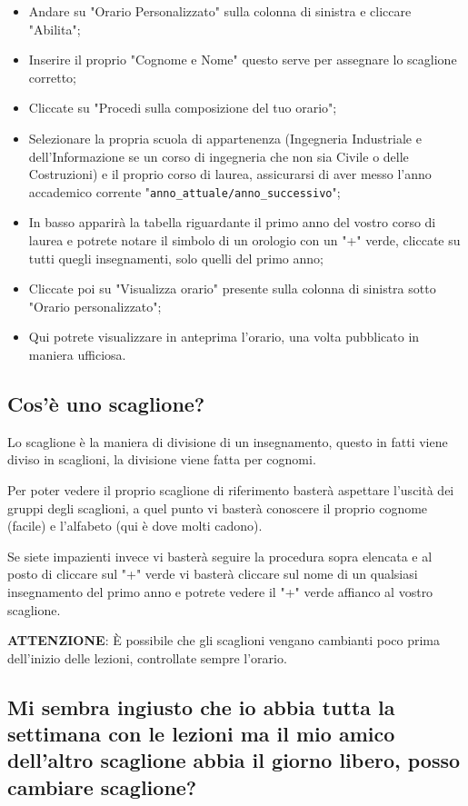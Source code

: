 \documentclass[legal]{polinetwork}
\begin{document}
\begin{itemize}
  \item Andare su "Orario Personalizzato" sulla colonna di sinistra e cliccare "Abilita";
  \item Inserire il proprio "Cognome e Nome" questo serve per assegnare lo scaglione corretto;
  \item Cliccate su "Procedi sulla composizione del tuo orario";
  \item Selezionare la propria scuola di appartenenza (Ingegneria Industriale e dell'Informazione se un corso di ingegneria che non sia Civile o delle Costruzioni) e il proprio corso di laurea, assicurarsi di aver messo l'anno accademico corrente "\texttt{anno\_attuale/anno\_successivo}";
  \item In basso apparirà la tabella riguardante il primo anno del vostro corso di laurea e potrete notare il simbolo di un orologio con un "+" verde, cliccate su tutti quegli insegnamenti, solo quelli del primo anno;
  \item Cliccate poi su "Visualizza orario" presente sulla colonna di sinistra sotto "Orario personalizzato";
  \item Qui potrete visualizzare in anteprima l'orario, una volta pubblicato in maniera ufficiosa.
\end{itemize}


\subsection{Cos'è uno scaglione?}


Lo scaglione è la maniera di divisione di un insegnamento, questo in fatti viene diviso in scaglioni, la divisione viene fatta per cognomi.

Per poter vedere il proprio scaglione di riferimento basterà aspettare l'uscità dei gruppi degli scaglioni, a quel punto vi basterà conoscere il proprio cognome (facile) e l'alfabeto (qui è dove molti cadono).

Se siete impazienti invece vi basterà seguire la procedura sopra elencata e al posto di cliccare sul "+" verde vi basterà cliccare sul nome di un qualsiasi insegnamento del primo anno e potrete vedere il "+" verde affianco al vostro scaglione.

\textbf{ATTENZIONE}: È possibile che gli scaglioni vengano cambianti poco prima dell'inizio delle lezioni, controllate sempre l'orario.

\subsection{Mi sembra ingiusto che io abbia tutta la settimana con le lezioni ma il mio amico dell'altro scaglione abbia il giorno libero, posso cambiare scaglione?}
\end{document}
